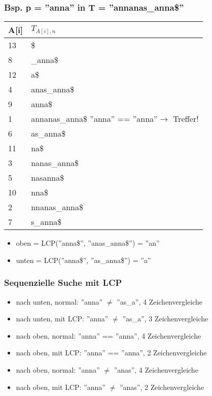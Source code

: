 \documentclass{beamer}
\begin{document}
\begin{frame}
\frametitle{Bsp. p = ''anna'' in T = ''annanas\_anna\$''}
\begin{tabular}{l|l<{\ttfamily}}
\textbf{A[i]} & $T_{A[i],n}$\\\hline
13 & \color{gray}\$\\
8 & \color{gray}\_anna\$\\
12 & \color{gray}a\$\\
4 & anas\_anna\$ \\
9 & anna\$ \\ %
1 & \color{red}anna\color{black}nas\_anna\$ ''anna'' == \color{red}''anna''\color{black}$\rightarrow$ Treffer!\\
6 & as\_anna\$ \\
11 & \color{gray}na\$\\
3 & \color{gray}nanas\_anna\$\\
5 & \color{gray}nasanna\$\\
10 & \color{gray}nna\$\\
2 & \color{gray}nnanas\_anna\$\\
7 & \color{gray}s\_anna\$\\
\end{tabular}
\begin{itemize}
\item oben = LCP(''anna\$'', ''anas\_anna\$'') = ''an''
\item unten = LCP(''anna\$'', ''as\_anna\$'') = ''a''
\end{itemize}
\end{frame}

\begin{frame}
\frametitle{Sequenzielle Suche mit LCP}
\begin{itemize}
\item nach unten, normal: ''anna'' $\neq$ ''as\_a'', 4 Zeichenvergleiche
\item nach unten, mit LCP: ''\color{gray}a\color{red}nna'' $\neq$ ''\color{gray}a\color{red}s\_a\color{black}'', 3 Zeichenvergleiche
\item nach oben, normal: ''anna'' == ''anna'', 4 Zeichenvergleiche
\item nach oben, mit LCP: ''\color{gray}an\color{red}na'' == ''\color{gray}an\color{red}na\color{black}'', 2 Zeichenvergleiche
\item nach oben, normal: ''anna'' $\neq$ ''anas'', 4 Zeichenvergleiche
\item nach oben, mit LCP: ''\color{gray}an\color{red}na'' $\neq$ ''\color{gray}an\color{red}as\color{black}'', 2 Zeichenvergleiche
\end{itemize}
\end{frame}
\end{document}
